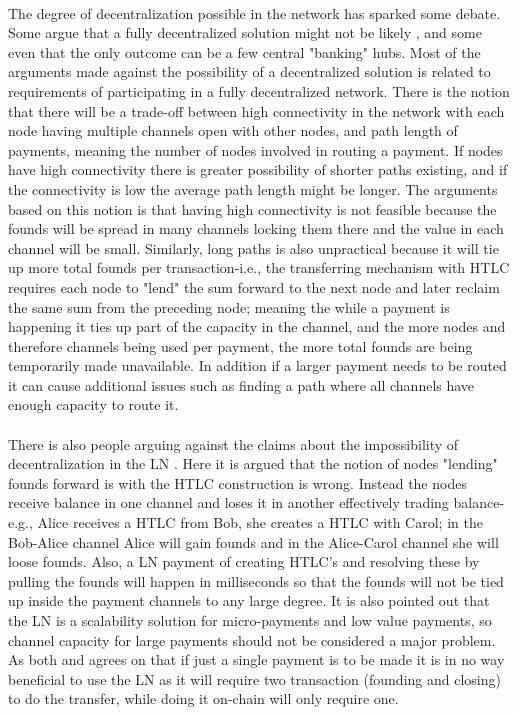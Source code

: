 \documentclass[informationsecurity]{gucmasterproject}
\begin{document}
\paragraph{}
The degree of decentralization possible in the network has sparked some debate. Some argue that a fully decentralized solution might not be likely \cite{sceptic1}, and some even that the only outcome can be a few central "banking" hubs\cite{sceptic2}. Most of the arguments made against the possibility of a decentralized solution is related to requirements of participating in a fully decentralized network. There is the notion that there will be a trade-off between high connectivity in the network with each node having multiple channels open with other nodes, and path length of payments, meaning the number of nodes involved in routing a payment. If nodes have high connectivity there is greater possibility of shorter paths existing, and if the connectivity is low the average path length might be longer.
The arguments based on this notion is  that having high connectivity is not feasible because the founds will be spread in many channels locking them there and the value in each channel will be small. Similarly, long paths is also unpractical because it will tie up more total founds per transaction-i.e., the transferring mechanism with HTLC requires each node to "lend" the sum forward to the next node and later reclaim the same sum from the preceding node; meaning the while a payment is happening it ties up part of the capacity in the channel, and the more nodes and therefore channels being used per payment, the more total founds are being temporarily made unavailable.
In addition if a larger payment needs to be routed it can cause additional issues such as finding a path where all channels have enough capacity to route it.

\paragraph{}
There is also people arguing against the claims about the impossibility of decentralization in the LN \cite{answer1}\cite{answer2}.
Here it is argued that the notion of nodes "lending" founds forward is with the HTLC construction is wrong.
Instead the nodes receive balance in one channel and loses it in another effectively trading balance-e.g., Alice receives a HTLC from Bob, she creates a HTLC with Carol; in the Bob-Alice channel Alice will gain founds and in the Alice-Carol channel she will loose founds.
Also, a LN payment of creating HTLC's and resolving these by pulling the founds will happen in milliseconds so that the founds will not be tied up inside the payment channels to any large degree. It is also pointed out that the LN is a scalability solution for micro-payments and low value payments, so channel capacity for large payments should not be considered a major problem. As both \cite{sceptic2} and \cite{answer1} agrees on that if just a single payment is to be made it is in no way beneficial to use the LN as it will require two transaction (founding and closing) to do the transfer, while doing it on-chain will only require one.
\end{document}
